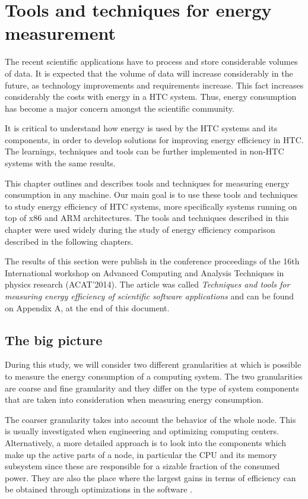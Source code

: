 \chapter{Tools and techniques for energy measurement}


The recent scientific applications have to process and store
considerable volumes of data. It is expected that the volume of
data will increase considerably in the future, as technology improvements and
requirements increase. This fact increases considerably
the costs with energy in a HTC system. Thus, energy consumption has
become a major concern amongst the scientific community.

It is critical to understand how energy is used by the HTC systems and its components, in order to develop solutions for improving energy efficiency in HTC. The learnings, techniques and tools can be further implemented in non-HTC systems with the same results.

This chapter outlines and describes tools and techniques for measuring energy consumption in any machine. Our main goal is to use these tools and techniques to study energy efficiency of HTC systems, more specifically systems running on top of x86 and ARM architectures. The tools and techniques described in this chapter were used widely during the study of energy efficiency comparison described in the following chapters. 


The results of this section were publish in the conference proceedings of the 16th International workshop on Advanced Computing and Analysis Techniques in physics research (ACAT'2014). The article was called \textit{Techniques and tools for measuring energy efficiency of scientific software applications} \cite{ACAT} and can be found on Appendix A, at the end of this document. 

\section{The big picture}

During this study, we will consider two different granularities at which is possible to measure the energy consumption of a computing system. The two granularities are coarse and fine granularity and they differ on the type of system components that are taken into consideration when measuring energy consumption.

The coarser granularity takes into account the behavior of the whole node. This is usually investigated when
engineering and optimizing computing centers. Alternatively, a more detailed approach is to
look into the components which make up the active parts of a
node, in particular the CPU and its memory subsystem since these
are responsible for a sizable fraction of the consumed power.
They are also the place where the largest gains in terms of efficiency 
can be obtained through optimizations in the software \cite{ACAT}.

